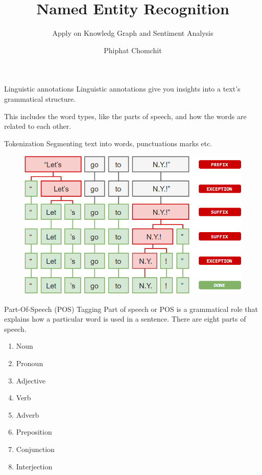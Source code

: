 \documentclass{beamer}
\title{Named Entity Recognition}
\subtitle{Apply on Knowledg Graph and Sentiment Analysis}
\author{Phiphat Chomchit}
\institute{CMU}
\date{}
\begin{document}
	\begin{frame}
		\titlepage
	\end{frame}

	\begin{frame}[t]{ Linguistic annotations}
		Linguistic annotations give you insights into a text’s grammatical structure.
		
		This includes the word types, like the parts of speech, and how the words are related to each other.
	\end{frame}

	\begin{frame}[t]{Tokenization}
		Segmenting text into words, punctuations marks etc.
		\begin{figure}
			\centering
			\includegraphics[scale=0.4]{token.png}
		\end{figure}
	\end{frame}

	\begin{frame}[t]{Part-Of-Speech (POS) Tagging}
		Part of speech or POS is a grammatical role that explains how a particular word is used in a sentence. There are eight parts of speech.
		\begin{enumerate}
			\item Noun
			\item Pronoun
			\item Adjective
			\item Verb
			\item Adverb
			\item Preposition
			\item Conjunction
			\item Interjection
		\end{enumerate}
	\end{frame}
\end{document}
